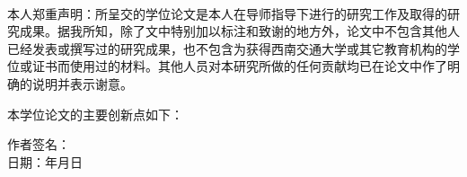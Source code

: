 \clearpagebyprint
\begin{center}
	\textbf{}
	\\
	\textbf{}
\end{center}

\vspace{7mm}
\linespread{1.75}\selectfont
本人郑重声明：所呈交的学位论文是本人在导师指导下进行的研究工作及取得的研究成果。据我所知，除了文中特别加以标注和致谢的地方外，论文中不包含其他人已经发表或撰写过的研究成果，也不包含为获得西南交通大学或其它教育机构的学位或证书而使用过的材料。其他人员对本研究所做的任何贡献均已在论文中作了明确的说明并表示谢意。\par

本学位论文的主要创新点如下：\par





\vspace{60mm}

\begin{flushright}
	作者签名：\fillinblank{10em}{}
	\\
	\vspace{7mm}
	日期：\qquad 年\qquad 月\qquad 日
\end{flushright}